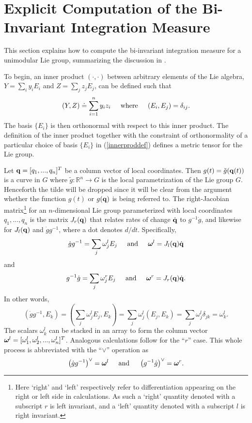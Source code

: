 \documentclass{svmult}
\def\htab{ {\hskip 0.1 true in} }
\newcommand{\beq}{ \begin{equation}}
\newcommand{\eeq}{ \end{equation} }
\newcommand{\IR}{\mathbb{R}}
\newcommand{\bfomega}{\mbox{\boldmath $\omega$ \unboldmath} \hskip -0.05 true in}
\newcommand{\qq}{{\bf q}}
\newcommand{\askip}{\htab\htab {\rm and} \htab\htab}
\newcommand{\wwskip}{\htab\htab {\rm where} \htab\htab}
\begin{document}
\section{Explicit Computation of the Bi-Invariant Integration Measure} \label{binivsec}

This section explains how to compute the bi-invariant integration measure for a unimodular Lie group, summarizing
the discussion in \cite{vol2,dover}.

To begin, an inner product $(\cdot,\cdot)$ between arbitrary elements of the Lie algebra, $Y = \sum_i y_i E_i$ and
$Z = \sum_j z_j E_j$, can be defined such that
\beq
(Y,Z) \doteq \sum_{i=1}^{n} y_i z_i \wwskip (E_i, E_j) = \delta_{ij}.
\label{innerproddef}
\eeq
The basis $\{E_i\}$ is then orthonormal with respect to this inner product.
The definition of the inner product together with the constraint of orthonormality of a particular choice of basis
$\{E_i\}$
in (\ref{innerproddef}) defines a metric tensor for the Lie group.

Let $\qq=[q_1,...,q_n]^T$ be a column vector of local coordinates. Then $g(t) = \tilde{g}(\qq(t))$ is a curve in $G$ where $\tilde{g}: \IR^n \rightarrow G$ is the local parametrization of the Lie group $G$. Henceforth
the tilde will be dropped since it will be clear from the argument whether the function $g(t)$ or $g(\qq)$
is being referred to.
The right-Jacobian matrix\footnote{Here `right' and `left' 
respectively refer to differentiation appearing on the right or left side in calculations.
As such a `right' quantity denoted with a subscript $r$ is left invariant, and a `left'
quantity denoted with a subscript $l$ is right invariant.} 
for an $n$-dimensional Lie group parameterized with local
coordinates $q_1, ..., q_n$ is the matrix $J_r(\qq)$ that relates rates of change $\dot{\qq}$
to $g^{-1} \dot{g}$, and likewise for $J_l(\qq)$ and $\dot{g} g^{-1}$, where a dot denotes $d/dt$. Specifically,
$$ \dot{g}  g^{-1} = \sum_j \omega_j^l E_j  \askip \bfomega^l = J_l(\qq) \dot{\qq} $$
and
$$ g^{-1} \dot{g} = \sum_j \omega_j^r E_j  \askip \bfomega^r = J_r(\qq) \dot{\qq}. $$
In other words,
$$ (\dot{g}  g^{-1}, E_k) = \left(\sum_j \omega_j^l E_j , E_k \right) = \sum_j \omega_j^l \left(E_j , E_k \right) = \sum_j \omega_j^l \delta_{jk} = \omega_k^l .$$
The scalars $\omega_k^l$ can be stacked in an array to
form the column vector $\bfomega^l = [\omega_1^l, \omega_2^l, ..., \omega_n^l]^T$.
Analogous calculations follow for the ``$r$'' case.
This whole process
is abbreviated with the ``$\vee$'' operation as
\beq
\left(\dot{g}  g^{-1}\right)^{\vee}  = \bfomega^l \askip \left(g^{-1} \dot{g}\right)^{\vee}  = \bfomega^r.
\label{veedefllsls}
\eeq
\end{document}
